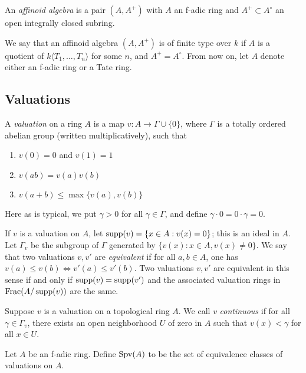 \begin{definition}
An \emph{affinoid algebra} is a pair $(A,A^+)$ with $A$ an f-adic ring and 
$A^+\subset A^\circ$ an open integrally closed subring. 
\end{definition}

We say that an affinoid algebra $(A,A^+)$ is of finite type over $k$ if 
$A$ is a quotient of $k\langle T_1,\dots,T_n\rangle$ for some $n$, and 
$A^+=A^\circ$. From now on, let $A$ denote either an f-adic ring or a Tate 
ring. 





\subsection{Valuations}

\begin{definition}
A \emph{valuation} on a ring $A$ is a map $v:A\to \Gamma\cup\{0\}$, where 
$\Gamma$ is a totally ordered abelian group (written multiplicatively), such 
that 
\begin{enumerate}
  \item $v(0)=0$ and $v(1)=1$ 
  \item $v(a b) = v(a) v(b)$ 
  \item $v(a+b)\leqslant \max\{v(a),v(b)\}$
\end{enumerate}
\end{definition}
Here as is typical, we put $\gamma>0$ for all $\gamma\in \Gamma$, and define 
$\gamma\cdot 0 = 0\cdot \gamma = 0$. 

If $v$ is a valuation on $A$, let $\operatorname{supp}(v) = \{x\in A:v(x)=0\}$; this is an 
ideal in $A$. Let $\Gamma_v$ be the subgroup of $\Gamma$ generated by 
$\{v(x):x\in A,v(x)\ne 0\}$. We say that two valuations $v,v'$ are 
\emph{equivalent} if for all $a,b\in A$, one has 
$v(a)\leqslant v(b)\Leftrightarrow v'(a)\leqslant v'(b)$. Two valuations 
$v,v'$ are equivalent in this sense if and only if $\operatorname{supp}(v)=\operatorname{supp}(v')$ and 
the associated valuation rings in $\operatorname{Frac}(A/\operatorname{supp}(v))$ are the 
same. 

Suppose $v$ is a valuation on a topological ring $A$. We call $v$ 
\emph{continuous} if for all $\gamma\in \Gamma_v$, there exists an open 
neighborhood $U$ of zero in $A$ such that $v(x)<\gamma$ for all $x\in U$. 

\begin{definition}
Let $A$ be an f-adic ring. Define $\operatorname{Spv}(A)$ to be the set of equivalence 
classes of valuations on $A$. 
\end{definition}

